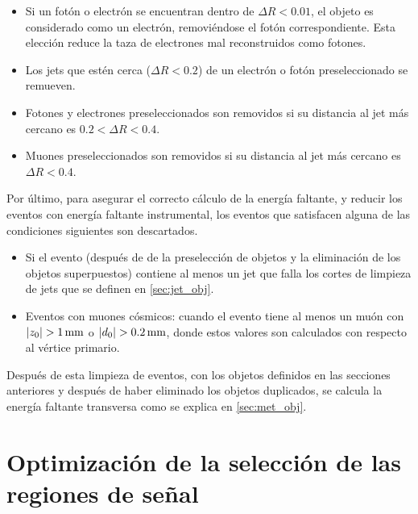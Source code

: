 \begin{itemize}\itemsep0.1cm
\item Si un fotón o electrón se encuentran dentro de $\Delta R < 0.01$, el
  objeto es considerado como un electrón, removiéndose el fotón correspondiente.
  Esta elección reduce la taza de electrones mal reconstruidos como fotones.
\item Los jets que estén cerca ($\Delta R<0.2$) de un electrón o fotón
  preseleccionado se remueven.
\item Fotones y electrones preseleccionados son removidos si su distancia al jet
  más cercano es $0.2 < \Delta R < 0.4$.
\item Muones preseleccionados son removidos si su distancia al jet más cercano
  es $\Delta R < 0.4$.
\end{itemize}



Por último, para asegurar el correcto cálculo de la energía faltante, y reducir
los eventos con energía faltante instrumental, los eventos que satisfacen
alguna de las condiciones siguientes son descartados.

\begin{itemize}\itemsep0.1cm
\item Si el evento (después de de la preselección de objetos y la eliminación de los objetos superpuestos) contiene al menos
  un jet que falla los cortes de limpieza de jets que se definen en
  \cref{sec:jet_obj}.

\item Eventos con muones cósmicos: cuando el evento tiene al menos un muón con $|z_{0}| > \unit[1]{mm}$ o $|d_0| >
  \unit[0.2]{mm}$, donde estos valores son calculados con respecto al vértice
  primario. %
\end{itemize}

Después de esta limpieza de eventos, con los objetos definidos en las secciones anteriores y después
de haber eliminado los objetos duplicados, se calcula la energía faltante transversa como se explica
en \cref{sec:met_obj}.



\section{Optimización de la selección de las regiones de señal}

